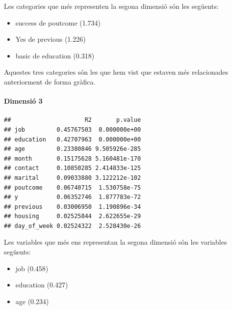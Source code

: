 \documentclass[
]{article}
\newenvironment{Shaded}{\begin{snugshade}}{\end{snugshade}}
\newcommand{\AttributeTok}[1]{\textcolor[rgb]{0.77,0.63,0.00}{#1}}
\newcommand{\NormalTok}[1]{#1}
\newcommand{\SpecialCharTok}[1]{\textcolor[rgb]{0.00,0.00,0.00}{#1}}
\newcommand{\StringTok}[1]{\textcolor[rgb]{0.31,0.60,0.02}{#1}}
\begin{document}
Les categories que més representen la segona dimensió són les següents:

\begin{itemize}
\item
  success de poutcome (1.734)
\item
  Yes de previous (1.226)
\item
  basic de education (0.318)
\end{itemize}

Aquestes tres categories són les que hem vist que estaven més
relacionades anteriorment de forma gràfica.

\hypertarget{dimensiuxf3-3}{%
\paragraph{Dimensió 3}\label{dimensiuxf3-3}}

\begin{Shaded}
\end{Shaded}

\begin{verbatim}
##                     R2       p.value
## job         0.45767503  0.000000e+00
## education   0.42707963  0.000000e+00
## age         0.23380846 9.505926e-285
## month       0.15175628 5.160481e-170
## contact     0.10850285 2.414833e-125
## marital     0.09033880 3.122212e-102
## poutcome    0.06740715  1.530758e-75
## y           0.06352746  1.877783e-72
## previous    0.03006950  1.190896e-34
## housing     0.02525844  2.622655e-29
## day_of_week 0.02524322  2.528430e-26
\end{verbatim}

Les variables que més ens representan la segona dimensió són les
variables següents:

\begin{itemize}
\item
  job (0.458)
\item
  education (0.427)
\item
  age (0.234)
\end{itemize}

\begin{Shaded}
\end{Shaded}
\end{document}

